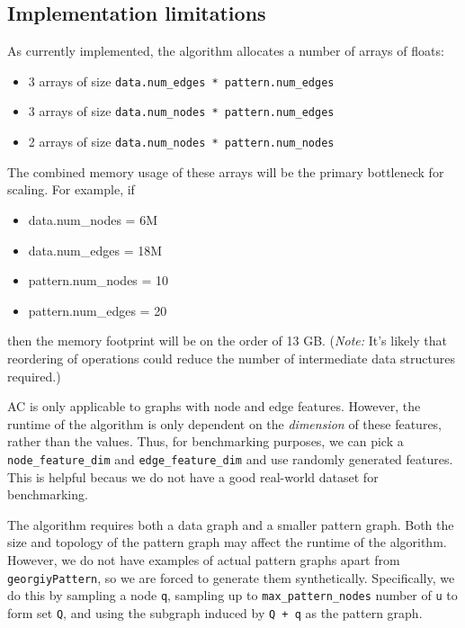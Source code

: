 \documentclass[10pt,oneside]{memoir}
\providecommand{\tightlist}{%
  \setlength{\itemsep}{0pt}\setlength{\parskip}{0pt}}
\begin{document}
\hypertarget{implementation-limitations}{%
\subsection{Implementation
limitations}\label{implementation-limitations}}

As currently implemented, the algorithm allocates a number of arrays of
floats:

\begin{itemize}
\tightlist
\item
  3 arrays of size \texttt{data.num\_edges\ *\ pattern.num\_edges}
\item
  3 arrays of size \texttt{data.num\_nodes\ *\ pattern.num\_edges}
\item
  2 arrays of size \texttt{data.num\_nodes\ *\ pattern.num\_nodes}
\end{itemize}

The combined memory usage of these arrays will be the primary bottleneck
for scaling. For example, if

\begin{itemize}
\tightlist
\item
  data.num\_nodes = 6M
\item
  data.num\_edges = 18M
\item
  pattern.num\_nodes = 10
\item
  pattern.num\_edges = 20
\end{itemize}

then the memory footprint will be on the order of 13 GB. (\emph{Note:}
It's likely that reordering of operations could reduce the number of
intermediate data structures required.)

AC is only applicable to graphs with node and edge features. However,
the runtime of the algorithm is only dependent on the \emph{dimension}
of these features, rather than the values. Thus, for benchmarking
purposes, we can pick a \texttt{node\_feature\_dim} and
\texttt{edge\_feature\_dim} and use randomly generated features. This is
helpful becaus we do not have a good real-world dataset for
benchmarking.

The algorithm requires both a data graph and a smaller pattern graph.
Both the size and topology of the pattern graph may affect the runtime
of the algorithm. However, we do not have examples of actual pattern
graphs apart from \texttt{georgiyPattern}, so we are forced to generate
them synthetically. Specifically, we do this by sampling a node
\texttt{q}, sampling up to \texttt{max\_pattern\_nodes} number of
\texttt{u} to form set \texttt{Q}, and using the subgraph induced by
\texttt{Q\ +\ q} as the pattern graph.
\end{document}
